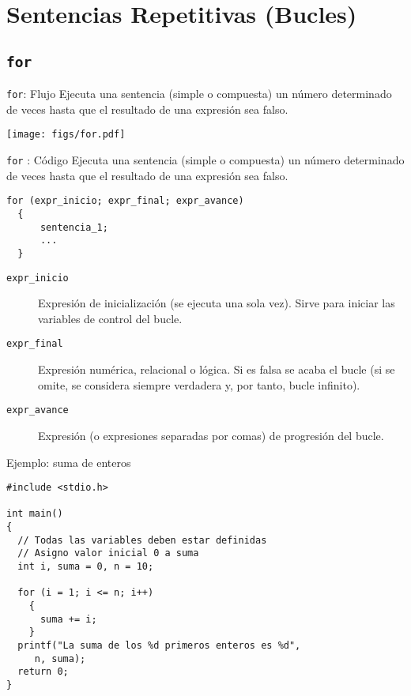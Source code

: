 \documentclass[xcolor={usenames,svgnames,dvipsnames}, aspectratio=169]{beamer}
\begin{document}
\section{Sentencias Repetitivas (Bucles)}
\label{sec:org00eb0a6}
\subsection{\texttt{for}}
\label{sec:org203e485}

\begin{frame}[label={sec:org0a17bf6},fragile]{\texttt{for}: Flujo}
 Ejecuta una sentencia (simple o compuesta) un número determinado de veces hasta que el resultado de una expresión sea falso.

\begin{center}
\texttt{[image: figs/for.pdf]}
\end{center}
\end{frame}

\begin{frame}[label={sec:orga113188},fragile]{\texttt{for} : Código}
 Ejecuta una sentencia (simple o compuesta) un número determinado de veces hasta que el resultado de una expresión sea falso.

\lstset{language=C,label= ,caption= ,captionpos=b,numbers=none}
\begin{lstlisting}
for (expr_inicio; expr_final; expr_avance)
  {
      sentencia_1;
      ...
  }
\end{lstlisting}

\begin{description}
\item[{\texttt{expr\_inicio}}] Expresión de inicialización (se ejecuta una sola vez). Sirve para iniciar las variables de control del bucle.
\item[{\texttt{expr\_final}}] Expresión numérica, relacional o lógica. Si es falsa se acaba el bucle (si se omite, se considera siempre verdadera y, por tanto, bucle infinito).
\item[{\texttt{expr\_avance}}] Expresión (o expresiones separadas por comas) de progresión del bucle.
\end{description}
\end{frame}

\begin{frame}[label={sec:org2ec9b0e},fragile]{Ejemplo: suma de enteros}
 \lstset{language=C,label= ,caption= ,captionpos=b,numbers=none}
\begin{lstlisting}
#include <stdio.h>

int main()
{
  // Todas las variables deben estar definidas
  // Asigno valor inicial 0 a suma
  int i, suma = 0, n = 10;

  for (i = 1; i <= n; i++)
    {
      suma += i;
    }
  printf("La suma de los %d primeros enteros es %d",
	 n, suma);
  return 0;
}
\end{lstlisting}
\end{frame}
\end{document}
